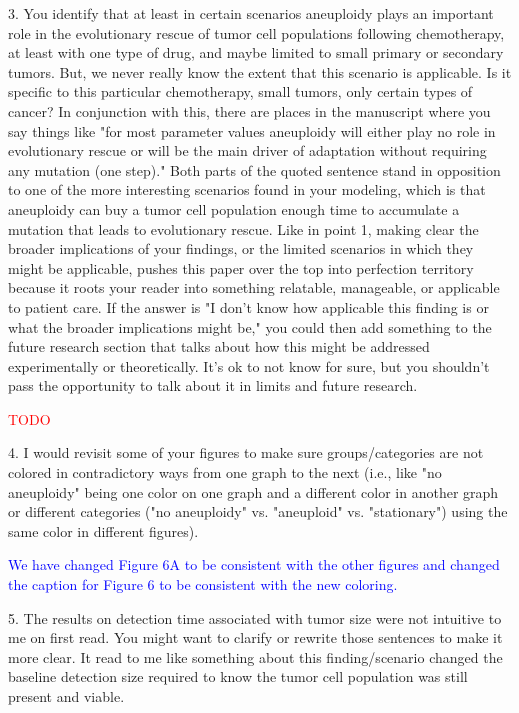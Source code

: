 \documentclass[12pt]{extarticle}
\begin{document}
3. You identify that at least in certain scenarios aneuploidy plays an important role in the evolutionary rescue of tumor cell populations following chemotherapy, at least with one type of drug, and maybe limited to small primary or secondary tumors. But, we never really know the extent that this scenario is applicable. Is it specific to this particular chemotherapy, small tumors, only certain types of cancer? In conjunction with this, there are places in the manuscript where you say things like "for most parameter values aneuploidy will either play no role in evolutionary rescue or will be the main driver of adaptation without requiring any mutation (one step)." Both parts of the quoted sentence stand in opposition to one of the more interesting scenarios found in your modeling, which is that aneuploidy can buy a tumor cell population enough time to accumulate a mutation that leads to evolutionary rescue. Like in point 1, making clear the broader implications of your findings, or the limited scenarios in which they might be applicable, pushes this paper over the top into perfection territory because it roots your reader into something relatable, manageable, or applicable to patient care. If the answer is "I don't know how applicable this finding is or what the broader implications might be," you could then add something to the future research section that talks about how this might be addressed experimentally or theoretically. It's ok to not know for sure, but you shouldn't pass the opportunity to talk about it in limits and future research.

\textcolor{red}{
TODO
} 

4. I would revisit some of your figures to make sure groups/categories are not colored in contradictory ways from one graph to the next (i.e., like "no aneuploidy" being one color on one graph and a different color in another graph or different categories ("no aneuploidy" vs. "aneuploid" vs. "stationary") using the same color in different figures).

\textcolor{blue}{ %
We have changed Figure 6A to be consistent with the other figures and changed the caption for Figure 6 to be consistent with the new coloring.
} 

5. The results on detection time associated with tumor size were not intuitive to me on first read. You might want to clarify or rewrite those sentences to make it more clear. It read to me like something about this finding/scenario changed the baseline detection size required to know the tumor cell population was still present and viable.
\end{document}
